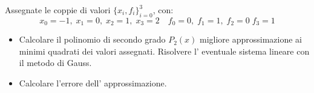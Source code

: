 Assegnate le coppie di valori $\{x_i,f_i \}_{i=0}^3$, con:
\[ x_0=-1, \; x_1=0, \; x_2=1, \; x_3=2 \quad f_0=0, \; f_1=1, \; f_2=0 \; f_3=1 \]
\begin{itemize}
\item Calcolare il polinomio di secondo grado $P_2(x)$
migliore approssimazione ai minimi quadrati dei valori assegnati.
Risolvere l' eventuale sistema lineare con il metodo di Gauss.
\item Calcolare l'errore dell' approssimazione.
\end {itemize}

